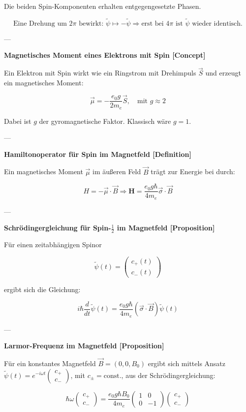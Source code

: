 \documentclass[10pt, letterpaper]{article}
\begin{document}
Die beiden Spin-Komponenten erhalten entgegengesetzte Phasen.

\[
\text{Eine Drehung um } 2\pi \text{ bewirkt: } \tilde{\psi} \mapsto -\tilde{\psi}
\Rightarrow \text{erst bei } 4\pi \text{ ist } \tilde{\psi} \text{ wieder identisch.}
\]

---

\textbf{Magnetisches Moment eines Elektrons mit Spin [Concept]}

Ein Elektron mit Spin wirkt wie ein Ringstrom mit Drehimpuls \( \vec{S} \) und erzeugt ein magnetisches Moment:

\[
\vec{\mu} = -\frac{e_0 g}{2 m_e} \vec{S}, \quad \text{mit } g \approx 2
\]

Dabei ist \( g \) der gyromagnetische Faktor. Klassisch wäre \( g = 1 \).

---

\textbf{Hamiltonoperator für Spin im Magnetfeld [Definition]}

Ein magnetisches Moment \( \vec{\mu} \) im äußeren Feld \( \vec{B} \) trägt zur Energie bei durch:

\[
H = -\vec{\mu} \cdot \vec{B}
\Rightarrow
\mathbf{H} = \frac{e_0 g \hbar}{4 m_e} \vec{\sigma} \cdot \vec{B}
\]

---

\textbf{Schrödingergleichung für Spin-\(\frac{1}{2}\) im Magnetfeld [Proposition]}

Für einen zeitabhängigen Spinor

\[
\tilde{\psi}(t) = \begin{pmatrix}c_+(t) \\ c_-(t)\end{pmatrix}
\]

ergibt sich die Gleichung:

\[
i\hbar \frac{d}{dt} \tilde{\psi}(t) = \frac{e_0 g \hbar}{4 m_e} (\vec{\sigma} \cdot \vec{B}) \tilde{\psi}(t)
\]


---

\textbf{Larmor-Frequenz im Magnetfeld [Proposition]}

Für ein konstantes Magnetfeld \( \vec{B} = (0, 0, B_0) \) ergibt sich mittels Ansatz \( \tilde{\psi}(t) = e^{-i \omega t} \begin{pmatrix} c_+ \\ c_- \end{pmatrix} \), mit \( c_\pm = \text{const.} \), aus der Schrödingergleichung:

\[
\hbar \omega \begin{pmatrix} c_+ \\ c_- \end{pmatrix}
= \frac{e_0 g \hbar B_0}{4 m_e}
\begin{pmatrix} 1 & 0 \\ 0 & -1 \end{pmatrix}
\begin{pmatrix} c_+ \\ c_- \end{pmatrix}
\]
\end{document}
